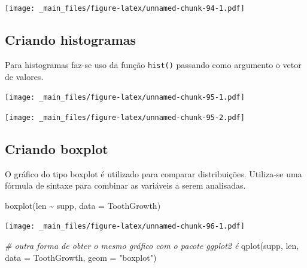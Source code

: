 \documentclass[
]{book}
\newenvironment{Shaded}{\begin{snugshade}}{\end{snugshade}}
\newcommand{\AttributeTok}[1]{\textcolor[rgb]{0.77,0.63,0.00}{#1}}
\newcommand{\CommentTok}[1]{\textcolor[rgb]{0.56,0.35,0.01}{\textit{#1}}}
\newcommand{\DecValTok}[1]{\textcolor[rgb]{0.00,0.00,0.81}{#1}}
\newcommand{\FunctionTok}[1]{\textcolor[rgb]{0.00,0.00,0.00}{#1}}
\newcommand{\NormalTok}[1]{#1}
\newcommand{\SpecialCharTok}[1]{\textcolor[rgb]{0.00,0.00,0.00}{#1}}
\newcommand{\StringTok}[1]{\textcolor[rgb]{0.31,0.60,0.02}{#1}}
\begin{document}
\texttt{[image: \_main\_files/figure-latex/unnamed-chunk-94-1.pdf]}

\hypertarget{criando-histogramas}{%
\subsection{Criando histogramas}\label{criando-histogramas}}

Para histogramas faz-se uso da função \texttt{hist()} passando como argumento o vetor de valores.

\begin{Shaded}
\end{Shaded}

\texttt{[image: \_main\_files/figure-latex/unnamed-chunk-95-1.pdf]}

\begin{Shaded}
\end{Shaded}

\texttt{[image: \_main\_files/figure-latex/unnamed-chunk-95-2.pdf]}

\hypertarget{criando-boxplot}{%
\subsection{Criando boxplot}\label{criando-boxplot}}

O gráfico do tipo boxplot é utilizado para comparar distribuições. Utiliza-se uma fórmula de sintaxe para combinar as variáveis a serem analisadas.

\begin{Shaded}
\begin{Highlighting}[]
\FunctionTok{boxplot}\NormalTok{(len }\SpecialCharTok{\textasciitilde{}}\NormalTok{ supp, }\AttributeTok{data =}\NormalTok{ ToothGrowth)}
\end{Highlighting}
\end{Shaded}

\texttt{[image: \_main\_files/figure-latex/unnamed-chunk-96-1.pdf]}

\begin{Shaded}
\begin{Highlighting}[]
\CommentTok{\# outra forma de obter o mesmo gráfico com o pacote ggplot2 é}
\FunctionTok{qplot}\NormalTok{(supp, len, }\AttributeTok{data =}\NormalTok{ ToothGrowth, }\AttributeTok{geom =} \StringTok{"boxplot"}\NormalTok{)}
\end{Highlighting}
\end{Shaded}
\end{document}
